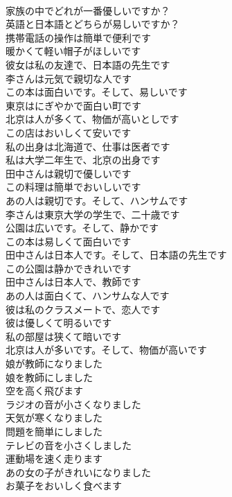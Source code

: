 \documentclass[8pt]{extreport}
\begin{document}
\begin{CJK}{UTF8}{min}
\\	家族の中でどれが一番優しいですか？	
\\	英語と日本語とどちらが易しいですか？	
\\	携帯電話の操作は簡単で便利です	
\\	暖かくて軽い帽子がほしいです	
\\	彼女は私の友達で、日本語の先生です	
\\	李さんは元気で親切な人です	
\\	この本は面白いです。そして、易しいです	
\\	東京はにぎやかで面白い町です	
\\	北京は人が多くて、物価が高いとしです	
\\	この店はおいしくて安いです	
\\	私の出身は北海道で、仕事は医者です	
\\	私は大学二年生で、北京の出身です	
\\	田中さんは親切で優しいです	
\\	この料理は簡単でおいしいです	
\\	あの人は親切です。そして、ハンサムです	
\\	李さんは東京大学の学生で、二十歳です	
\\	公園は広いです。そして、静かです	
\\	この本は易しくて面白いです	
\\	田中さんは日本人です。そして、日本語の先生です	
\\	この公園は静かできれいです	
\\	田中さんは日本人で、教師です	
\\	あの人は面白くて、ハンサムな人です	
\\	彼は私のクラスメートで、恋人です	
\\	彼は優しくて明るいです	
\\	私の部屋は狭くて暗いです	
\\	北京は人が多いです。そして、物価が高いです	
\\	娘が教師になりました	
\\	娘を教師にしました	
\\	空を高く飛びます	
\\	ラジオの音が小さくなりました	
\\	天気が寒くなりました	
\\	問題を簡単にしました	
\\	テレビの音を小さくしました	
\\	運動場を速く走ります	
\\	あの女の子がきれいになりました	
\\	お菓子をおいしく食べます	

\end{CJK}
\end{document}
